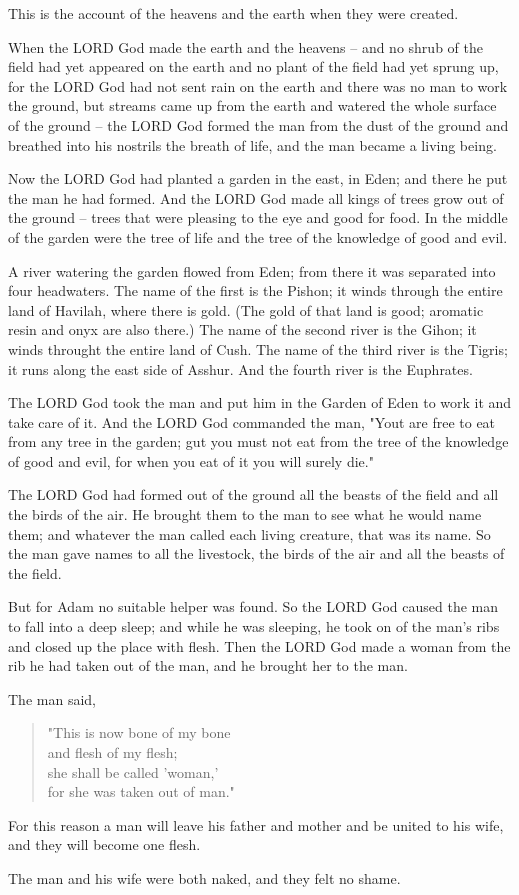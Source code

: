 \V This is the account of the heavens and the earth when they were created.

When the LORD God made the earth and the heavens -- \V and no shrub of the field
had yet appeared on the earth and no plant of the field had yet sprung up, for
the LORD God had not sent rain on the earth and there was no man to work the
ground, \V but streams came up from the earth and watered the whole surface of
the ground -- \V the LORD God formed the man from the dust of the ground and
breathed into his nostrils the breath of life, and the man became a living
being.

\V Now the LORD God had planted a garden in the east, in Eden; and there he put
the man he had formed. \V And the LORD God made all kings of trees grow out of
the ground -- trees that were pleasing to the eye and good for food. In the
middle of the garden were the tree of life and the tree of the knowledge of good
and evil.

\V A river watering the garden flowed from Eden; from there it was separated
into four headwaters. \V The name of the first is the Pishon; it winds through
the entire land of Havilah, where there is gold. \V (The gold of that land is
good; aromatic resin and onyx are also there.) \V The name of the second river
is the Gihon; it winds throught the entire land of Cush. \V The name of the
third river is the Tigris; it runs along the east side of Asshur. And the fourth
river is the Euphrates.

\V The LORD God took the man and put him in the Garden of Eden to work it and
take care of it. \V And the LORD God commanded the man, "Yout are free to eat
from any tree in the garden; \V gut you must not eat from the tree of the
knowledge of good and evil, for when you eat of it you will surely die."

\V The LORD God had formed out of the ground all the beasts of the field and all
the birds of the air. He brought them to the man to see what he would name them;
and whatever the man called each living creature, that was its name. \V So the
man gave names to all the livestock, the birds of the air and all the beasts of
the field.

\V But for Adam no suitable helper was found. \V So the LORD God caused the man
to fall into a deep sleep; and while he was sleeping, he took on of the man's
ribs and closed up the place with flesh. \V Then the LORD God made a woman from
the rib he had taken out of the man, and he brought her to the man.

\V The man said,

\begin{quotation}
"This is now bone of my bone\\
and flesh of my flesh;\\
she shall be called 'woman,'\\
for she was taken out of man."
\end{quotation}

\V For this reason a man will leave his father and mother and be united to his
wife, and they will become one flesh.

\V The man and his wife were both naked, and they felt no shame.
